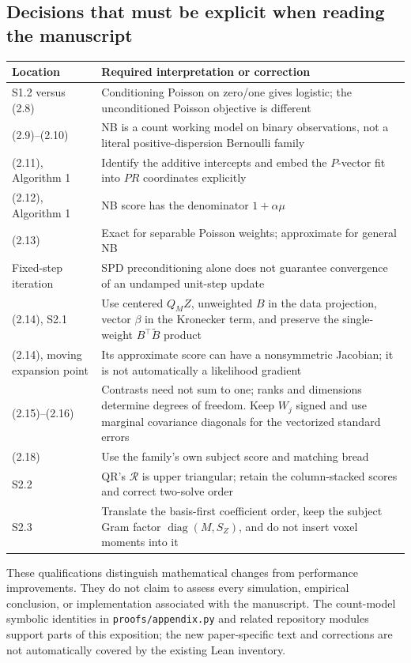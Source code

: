 \documentclass[11pt,a4paper]{article}
\newcommand{\diag}{\operatorname{diag}}
\numberwithin{equation}{section}
\begin{document}
\subsection{Decisions that must be explicit when reading the manuscript}
\begin{center}\small
\begin{tabularx}{\textwidth}{lT}
\toprule
Location & Required interpretation or correction\\
\midrule
S1.2 versus (2.8) & Conditioning Poisson on zero/one gives logistic;
the unconditioned Poisson objective is different\\
(2.9)--(2.10) & NB is a count working model on binary observations,
not a literal positive-dispersion Bernoulli family\\
(2.11), Algorithm 1 & Identify the additive intercepts and embed the
$P$-vector fit into $PR$ coordinates explicitly\\
(2.12), Algorithm 1 & NB score has the denominator $1+\alpha\mu$\\
(2.13) & Exact for separable Poisson weights; approximate for general NB\\
Fixed-step iteration & SPD preconditioning alone does not guarantee
convergence of an undamped unit-step update\\
(2.14), S2.1 & Use centered $Q_MZ$, unweighted $B$ in the data
projection, vector $\beta$ in the Kronecker term, and preserve
the single-weight $B^\top\widetilde B$ product\\
(2.14), moving expansion point & Its approximate score can have a
nonsymmetric Jacobian; it is not automatically a likelihood gradient\\
(2.15)--(2.16) & Contrasts need not sum to one; ranks and dimensions
determine degrees of freedom. Keep $W_j$ signed and use marginal
covariance diagonals for the vectorized standard errors\\
(2.18) & Use the family's own subject score and matching bread\\
S2.2 & QR's $\mathcal R$ is upper triangular; retain the column-stacked
scores and correct two-solve order\\
S2.3 & Translate the basis-first coefficient order, keep the subject
Gram factor $\diag(M,S_Z)$, and do not insert voxel moments into it\\
\bottomrule
\end{tabularx}
\end{center}
These qualifications distinguish mathematical changes from performance
improvements. They do not claim to assess every simulation, empirical
conclusion, or implementation associated with the manuscript.
The count-model symbolic identities in \texttt{proofs/appendix.py}
and related repository modules support parts of this exposition;
the new paper-specific text and corrections are not automatically
covered by the existing Lean inventory.
\end{document}

